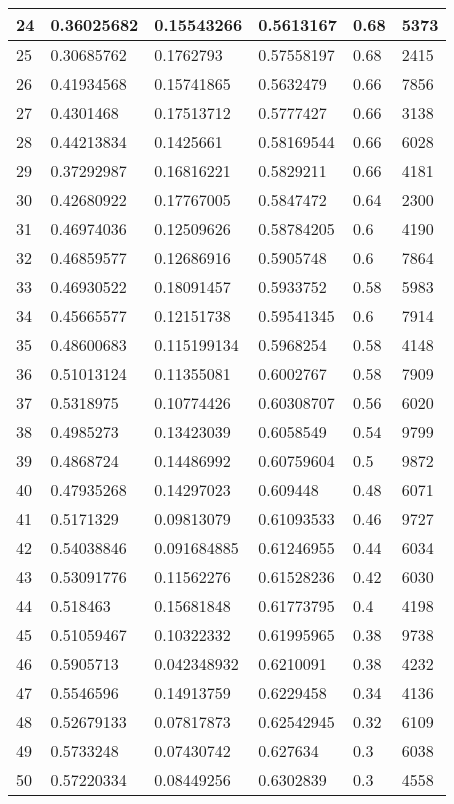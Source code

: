 \begin{longtable}{|l|l|l|l|l|l|}
24 & 0.36025682 & 0.15543266 & 0.5613167 & 0.68 & 5373 \\ \hline 
25 & 0.30685762 & 0.1762793 & 0.57558197 & 0.68 & 2415 \\ \hline 
26 & 0.41934568 & 0.15741865 & 0.5632479 & 0.66 & 7856 \\ \hline 
27 & 0.4301468 & 0.17513712 & 0.5777427 & 0.66 & 3138 \\ \hline 
28 & 0.44213834 & 0.1425661 & 0.58169544 & 0.66 & 6028 \\ \hline 
29 & 0.37292987 & 0.16816221 & 0.5829211 & 0.66 & 4181 \\ \hline 
30 & 0.42680922 & 0.17767005 & 0.5847472 & 0.64 & 2300 \\ \hline 
31 & 0.46974036 & 0.12509626 & 0.58784205 & 0.6 & 4190 \\ \hline 
32 & 0.46859577 & 0.12686916 & 0.5905748 & 0.6 & 7864 \\ \hline 
33 & 0.46930522 & 0.18091457 & 0.5933752 & 0.58 & 5983 \\ \hline 
34 & 0.45665577 & 0.12151738 & 0.59541345 & 0.6 & 7914 \\ \hline 
35 & 0.48600683 & 0.115199134 & 0.5968254 & 0.58 & 4148 \\ \hline 
36 & 0.51013124 & 0.11355081 & 0.6002767 & 0.58 & 7909 \\ \hline 
37 & 0.5318975 & 0.10774426 & 0.60308707 & 0.56 & 6020 \\ \hline 
38 & 0.4985273 & 0.13423039 & 0.6058549 & 0.54 & 9799 \\ \hline 
39 & 0.4868724 & 0.14486992 & 0.60759604 & 0.5 & 9872 \\ \hline 
40 & 0.47935268 & 0.14297023 & 0.609448 & 0.48 & 6071 \\ \hline 
41 & 0.5171329 & 0.09813079 & 0.61093533 & 0.46 & 9727 \\ \hline 
42 & 0.54038846 & 0.091684885 & 0.61246955 & 0.44 & 6034 \\ \hline 
43 & 0.53091776 & 0.11562276 & 0.61528236 & 0.42 & 6030 \\ \hline 
44 & 0.518463 & 0.15681848 & 0.61773795 & 0.4 & 4198 \\ \hline 
45 & 0.51059467 & 0.10322332 & 0.61995965 & 0.38 & 9738 \\ \hline 
46 & 0.5905713 & 0.042348932 & 0.6210091 & 0.38 & 4232 \\ \hline 
47 & 0.5546596 & 0.14913759 & 0.6229458 & 0.34 & 4136 \\ \hline 
48 & 0.52679133 & 0.07817873 & 0.62542945 & 0.32 & 6109 \\ \hline 
49 & 0.5733248 & 0.07430742 & 0.627634 & 0.3 & 6038 \\ \hline 
50 & 0.57220334 & 0.08449256 & 0.6302839 & 0.3 & 4558 \\ \hline 
\end{longtable}
